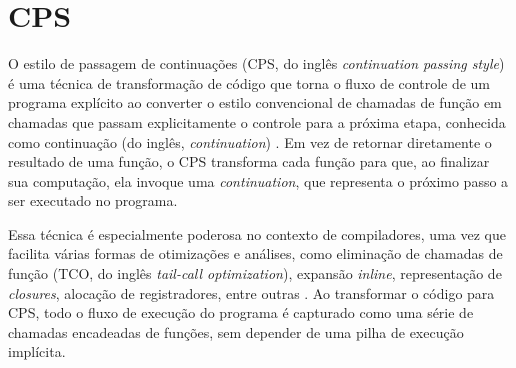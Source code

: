 \section{CPS}\label{sec:cps}

O estilo de passagem de continuações (CPS, do inglês \textit{continuation passing style}) é uma técnica de transformação de código que torna o fluxo de controle de um programa explícito ao converter o estilo convencional de chamadas de função em chamadas que passam explicitamente o controle para a próxima etapa, conhecida como continuação (do inglês, \textit{continuation}) \cite{appel1992compiling}.
Em vez de retornar diretamente o resultado de uma função, o CPS transforma cada função para que, ao finalizar sua computação, ela invoque uma \textit{continuation}, que representa o próximo passo a ser executado no programa.

Essa técnica é especialmente poderosa no contexto de compiladores, uma vez que facilita várias formas de otimizações e análises, como eliminação de chamadas de função (TCO, do inglês \textit{tail-call optimization}), expansão \textit{inline}, representação de \textit{closures}, alocação de registradores, entre outras \cite{appel1992compiling}.
Ao transformar o código para CPS, todo o fluxo de execução do programa é capturado como uma série de chamadas encadeadas de funções, sem depender de uma pilha de execução implícita.









